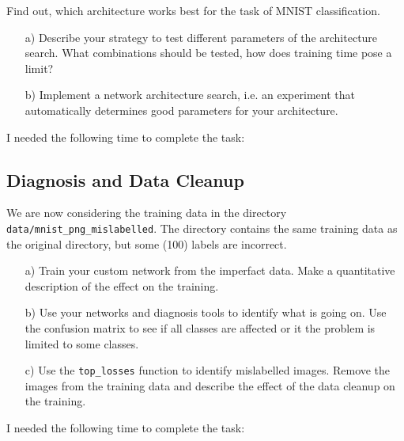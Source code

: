 Find out, which architecture works best for the task of MNIST classification. 

\begin{enumerate}
	\item[a)] Describe your strategy to test different parameters of the architecture search. What combinations should be tested, how does training time pose a limit?
	\item[b)] Implement a network architecture search, i.e. an experiment that automatically determines good parameters for your architecture.
\end{enumerate}

I needed the following time to complete the task:

\subsection{Diagnosis and Data Cleanup}

We are now considering the training data in the directory \texttt{data/mnist\_png\_mislabelled}. The directory contains the same training data as the original directory, but some (100) labels are incorrect.

\begin{enumerate}
	\item[a)] Train your custom network from the imperfact data. Make a quantitative description of the effect on the training.
	\item[b)] Use your networks and diagnosis tools to identify what is going on. Use the confusion matrix to see if all classes are affected or it the problem is limited to some classes.
	\item[c)] Use the \texttt{top\_losses} function to identify mislabelled images. Remove the images from the training data and describe the effect of the data cleanup on the training.
\end{enumerate}

I needed the following time to complete the task:

